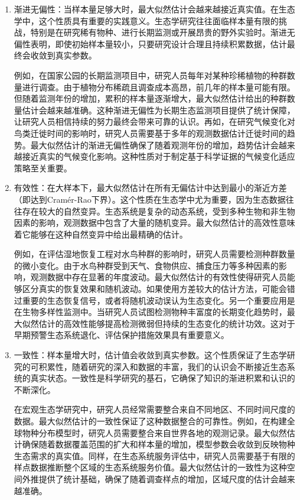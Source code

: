 \documentclass[
  twoside,12pt,fontset=none]{ctexbook}
\begin{document}
\begin{enumerate}
\def\labelenumi{\arabic{enumi}.}
\item
  渐进无偏性：当样本量足够大时，最大似然估计会越来越接近真实值。在生态学中，这个性质具有重要的实践意义。生态学研究往往面临样本量有限的挑战，特别是在研究稀有物种、进行长期监测或开展昂贵的野外实验时。渐进无偏性表明，即使初始样本量较小，只要研究设计合理且持续积累数据，估计最终会收敛到真实参数。

  例如，在国家公园的长期监测项目中，研究人员每年对某种珍稀植物的种群数量进行调查。由于植物分布稀疏且调查成本高昂，前几年的样本量可能有限。但随着监测年份的增加，累积的样本量逐渐增大，最大似然估计给出的种群数量估计会越来越准确。这种渐进无偏性为长期生态监测项目提供了统计保障，让研究人员相信持续的努力最终会带来可靠的认识。再如，在研究气候变化对鸟类迁徙时间的影响时，研究人员需要基于多年的观测数据估计迁徙时间的趋势。最大似然估计的渐进无偏性确保了随着观测年份的增加，趋势估计会越来越接近真实的气候变化影响。这种性质对于制定基于科学证据的气候变化适应策略至关重要。
\item
  有效性：在大样本下，最大似然估计在所有无偏估计中达到最小的渐近方差（即达到Cramér-Rao下界）。这个性质在生态学中尤为重要，因为生态数据往往存在较大的自然变异。生态系统是复杂的动态系统，受到多种生物和非生物因素的影响，观测数据中包含了大量的随机变异。最大似然估计的高效性意味着它能够在这种自然变异中给出最精确的估计。

  例如，在评估湿地恢复工程对水鸟种群的影响时，研究人员需要检测种群数量的微小变化。由于水鸟种群受到天气、食物供应、捕食压力等多种因素的影响，观测数据中存在显著的年度波动。最大似然估计的有效性使得研究人员能够区分真实的恢复效果和随机波动。如果使用方差较大的估计方法，可能会错过重要的生态恢复信号，或者将随机波动误认为生态变化。另一个重要应用是在生物多样性监测中。当研究人员试图检测物种丰富度的长期变化趋势时，最大似然估计的高效性能够提高检测微弱但持续的生态变化的统计功效。这对于早期预警生态系统退化、评估保护措施效果具有重要意义。
\item
  一致性：样本量增大时，估计值会收敛到真实参数。这个性质保证了生态学研究的可积累性，随着研究的深入和数据的丰富，我们的认识会不断接近生态系统的真实状态。一致性是科学研究的基石，它确保了知识的渐进积累和认识的不断深化。

  在宏观生态学研究中，研究人员经常需要整合来自不同地区、不同时间尺度的数据。最大似然估计的一致性保证了这种数据整合的可靠性。例如，在构建全球物种分布模型时，研究人员需要整合来自世界各地的观测记录。最大似然估计确保随着数据覆盖范围的扩大和样本量的增加，模型参数会收敛到反映物种生态需求的真实值。同样，在生态系统服务评估中，研究人员需要基于有限的样点数据推断整个区域的生态系统服务价值。最大似然估计的一致性为这种空间外推提供了统计基础，确保了随着调查样点的增加，区域尺度的估计会越来越准确。
\end{enumerate}
\end{document}
